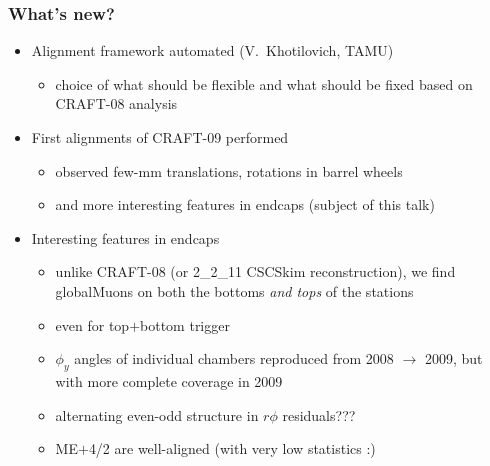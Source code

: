 \documentclass[compress]{beamer}
\begin{document}
\begin{frame}
\frametitle{What's new?}
\begin{itemize}\setlength{\itemsep}{0.25 cm}
\item Alignment framework automated \hfill (V.~Khotilovich, TAMU)
\begin{itemize}
\item choice of what should be flexible and what should be fixed based on CRAFT-08 analysis
\end{itemize}
\item First alignments of CRAFT-09 performed
\begin{itemize}\setlength{\itemsep}{0.1 cm}
\item observed few-mm translations, rotations in barrel wheels
\item and more interesting features in endcaps (subject of this talk)
\end{itemize}
\item Interesting features in endcaps
\begin{itemize}\setlength{\itemsep}{0.1 cm}
\item unlike CRAFT-08 (or 2\_2\_11 CSCSkim reconstruction), we find
  globalMuons on both the bottoms {\it and tops} of the stations
\item even for top$+$bottom trigger
\item $\phi_y$ angles of individual chambers reproduced from 2008
  $\to$ 2009, but with more complete coverage in 2009
\item alternating even-odd structure in $r\phi$ residuals???
\item ME$+$4/2 are well-aligned (with very low statistics :)
\end{itemize}
\end{itemize}
\end{frame}
\end{document}
